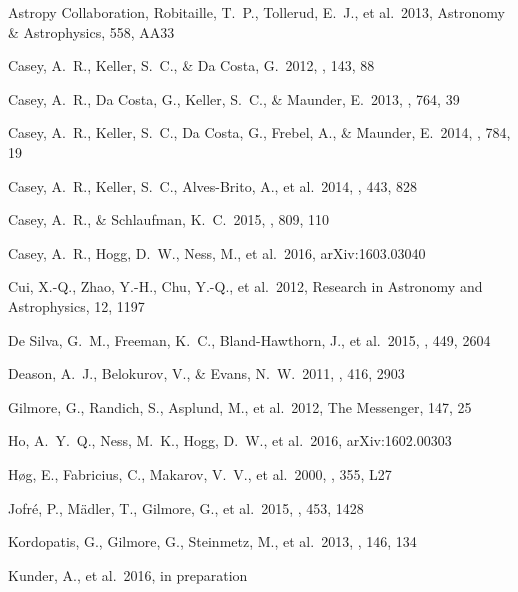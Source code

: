 \documentclass[preprint,trackchanges]{aastex}
\begin{document}
\begin{thebibliography}{dummy}
 Astropy Collaboration, Robitaille, T.~P., Tollerud, E.~J., et al.\ 2013, Astronomy \& Astrophysics, 558, AA33

 Casey, A.~R., Keller, S.~C., \& Da Costa, G.\ 2012, \aj, 143, 88 

 Casey, A.~R., Da Costa, G., Keller, S.~C., \& Maunder, E.\ 2013, \apj, 764, 39 

 Casey, A.~R., Keller, S.~C., Da Costa, G., Frebel, A., \& Maunder, E.\ 2014, \apj, 784, 19 

 Casey, A.~R., Keller, S.~C., Alves-Brito, A., et al.\ 2014, \mnras, 443, 828 

 Casey, A.~R., \& Schlaufman, K.~C.\ 2015, \apj, 809, 110 

 Casey, A.~R., Hogg, D.~W., Ness, M., et al.\ 2016, arXiv:1603.03040 

 Cui, X.-Q., Zhao, Y.-H., Chu, Y.-Q., et al.\ 2012, Research in Astronomy and Astrophysics, 12, 1197 

 De Silva, G.~M., Freeman, K.~C., Bland-Hawthorn, J., et al.\ 2015, \mnras, 449, 2604 

 Deason, A.~J., Belokurov, V., \& Evans, N.~W.\ 2011, \mnras, 416, 2903 

 Gilmore, G., Randich, S., Asplund, M., et al.\ 2012, The Messenger, 147, 25

 Ho, A.~Y.~Q., Ness, M.~K., Hogg, D.~W., et al.\ 2016, arXiv:1602.00303 
 
 H{\o}g, E., Fabricius, C., Makarov, V.~V., et al.\ 2000, \aap, 355, L27 

 Jofr{\'e}, P., M{\"a}dler, T., Gilmore, G., et al.\ 2015, \mnras, 453, 1428 

 Kordopatis, G., Gilmore, G., Steinmetz, M., et al.\ 2013, \aj, 146, 134 

 Kunder, A., et al.\ 2016, in preparation


\end{thebibliography}
\end{document}
